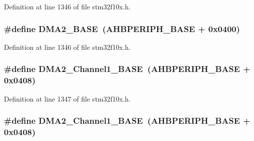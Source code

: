 Definition at line 1346 of file stm32f10x.\+h.

\subsubsection[{\texorpdfstring{D\+M\+A2\+\_\+\+B\+A\+SE}{DMA2_BASE}}]{\setlength{\rightskip}{0pt plus 5cm}\#define D\+M\+A2\+\_\+\+B\+A\+SE~({\bf A\+H\+B\+P\+E\+R\+I\+P\+H\+\_\+\+B\+A\+SE} + 0x0400)}\hypertarget{group___peripheral__memory__map_gab72a9ae145053ee13d1d491fb5c1df64}{}\label{group___peripheral__memory__map_gab72a9ae145053ee13d1d491fb5c1df64}


Definition at line 1346 of file stm32f10x.\+h.

\subsubsection[{\texorpdfstring{D\+M\+A2\+\_\+\+Channel1\+\_\+\+B\+A\+SE}{DMA2_Channel1_BASE}}]{\setlength{\rightskip}{0pt plus 5cm}\#define D\+M\+A2\+\_\+\+Channel1\+\_\+\+B\+A\+SE~({\bf A\+H\+B\+P\+E\+R\+I\+P\+H\+\_\+\+B\+A\+SE} + 0x0408)}\hypertarget{group___peripheral__memory__map_gad3bd6c4201d12f5d474518c1b02f8e3b}{}\label{group___peripheral__memory__map_gad3bd6c4201d12f5d474518c1b02f8e3b}


Definition at line 1347 of file stm32f10x.\+h.

\subsubsection[{\texorpdfstring{D\+M\+A2\+\_\+\+Channel1\+\_\+\+B\+A\+SE}{DMA2_Channel1_BASE}}]{\setlength{\rightskip}{0pt plus 5cm}\#define D\+M\+A2\+\_\+\+Channel1\+\_\+\+B\+A\+SE~({\bf A\+H\+B\+P\+E\+R\+I\+P\+H\+\_\+\+B\+A\+SE} + 0x0408)}\hypertarget{group___peripheral__memory__map_gad3bd6c4201d12f5d474518c1b02f8e3b}{}\label{group___peripheral__memory__map_gad3bd6c4201d12f5d474518c1b02f8e3b}


